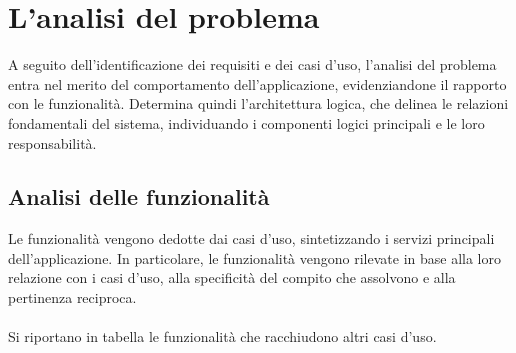 \section{L’analisi del problema}

A seguito dell'identificazione dei requisiti e dei casi d'uso,
l'analisi del problema entra nel merito del comportamento dell'applicazione,
evidenziandone il rapporto con le funzionalità.
Determina quindi l'architettura logica, che delinea le relazioni fondamentali del sistema, 
individuando i componenti logici principali e le loro responsabilità.\\

\subsection{Analisi delle funzionalità}

Le funzionalità vengono dedotte dai casi d'uso, sintetizzando i servizi principali dell'applicazione.
In particolare, le funzionalità vengono rilevate in base alla loro relazione con i casi d'uso,
alla specificità del compito che assolvono e alla pertinenza reciproca.\\
\\
Si riportano in tabella le funzionalità che racchiudono altri casi d'uso.\\

